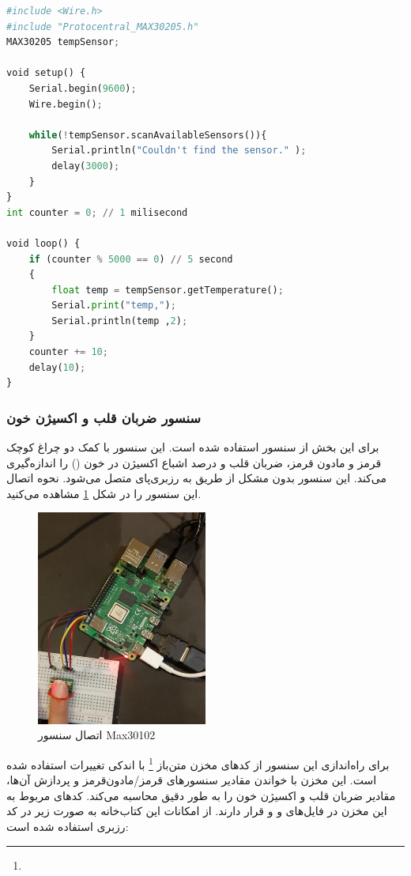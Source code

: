 \begin{latin}
	\begin{lstlisting}[language=python]
#include <Wire.h>
#include "Protocentral_MAX30205.h"
MAX30205 tempSensor;

void setup() {
	Serial.begin(9600);
	Wire.begin();
	
	while(!tempSensor.scanAvailableSensors()){
		Serial.println("Couldn't find the sensor." );
		delay(3000);
	}
}
int counter = 0; // 1 milisecond

void loop() {	
	if (counter % 5000 == 0) // 5 second
	{
		float temp = tempSensor.getTemperature(); 
		Serial.print("temp,");
		Serial.println(temp ,2);
	}
	counter += 10;
	delay(10);
}

\end{lstlisting}
\end{latin}


\subsubsection{سنسور ضربان قلب و اکسیژن خون}


برای این بخش از سنسور  استفاده شده است. این سنسور با کمک دو چراغ کوچک قرمز و مادون قرمز، ضربان قلب و درصد اشباع اکسیژن در خون () را اندازه‌گیری می‌کند. این سنسور بدون مشکل از طریق  به رزبری‌پای متصل می‌شود. نحوه اتصال این سنسور را در شکل \ref{fig:5} مشاهده می‌کنید.

\begin{figure}[h]
	\centering
	\includegraphics[width=0.5\textwidth]{figs/max30102.jpg}
	
	\caption{اتصال سنسور Max30102}
	\label{fig:5}
\end{figure}


برای راه‌اندازی این سنسور از کدهای مخزن ‌متن‌باز 
\footnote{}
با اندکی تغییرات
 استفاده شده است. این مخزن با خواندن مقادیر سنسورهای قرمز/مادون‌قرمز و پردازش آن‌ها، مقادیر ضربان قلب و اکسیژن خون را به طور دقیق محاسبه می‌کند. کدهای مربوط به این مخزن در فایل‌های 
 و
 و 
 قرار دارند.
از امکانات این کتاب‌خانه به صورت زیر در کد رزبری استفاده شده است:

